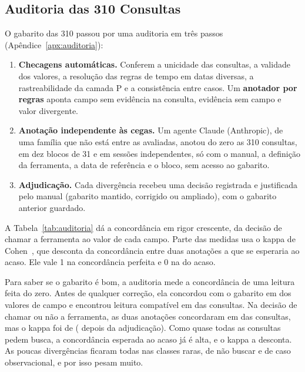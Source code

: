 \subsection{Auditoria das 310 Consultas}
\label{sec:auditoria}

O gabarito das 310 passou por uma auditoria em três passos (Apêndice~\ref{apx:auditoria}):
\begin{enumerate}
  \item \textbf{Checagens automáticas.} Conferem a unicidade das consultas, a validade dos valores, a resolução das regras de tempo em datas diversas, a rastreabilidade da camada P e a consistência entre casos. Um \textbf{anotador por regras} aponta campo sem evidência na consulta, evidência sem campo e valor divergente.
  \item \textbf{Anotação independente às cegas.} Um agente Claude (Anthropic), de uma família que não está entre as avaliadas, anotou do zero as 310 consultas, em dez blocos de 31 e em sessões independentes, só com o manual, a definição da ferramenta, a data de referência e o bloco, sem acesso ao gabarito.
  \item \textbf{Adjudicação.} Cada divergência recebeu uma decisão registrada e justificada pelo manual (gabarito mantido, corrigido ou ampliado), com o gabarito anterior guardado.
\end{enumerate}

A Tabela~\ref{tab:auditoria} dá a concordância em rigor crescente, da decisão de chamar a ferramenta ao valor de cada campo. Parte das medidas usa o kappa de Cohen~\cite{cohen1960coefficient,artstein2008intercoder}, que desconta da concordância entre duas anotações a que se esperaria ao acaso. Ele vale 1 na concordância perfeita e 0 na do acaso.



Para saber se o gabarito é bom, a auditoria mede a concordância de uma leitura feita do zero. Antes de qualquer correção, ela concordou com o gabarito em  dos valores de campo e encontrou leitura compatível em  das  consultas. Na decisão de chamar ou não a ferramenta, as duas anotações concordaram em  das  consultas, mas o kappa foi de  ( depois da adjudicação). Como quase todas as consultas pedem busca, a concordância esperada ao acaso já é alta, e o kappa a desconta. As poucas divergências ficaram todas nas classes raras, de não buscar e de caso observacional, e por isso pesam muito.

